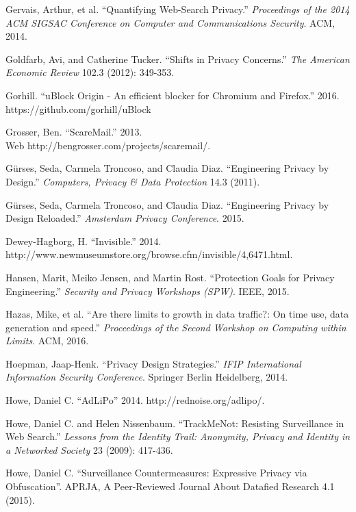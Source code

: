 \documentclass[conference]{IEEEtran}
\begin{document}
\begin{thebibliography}{99}
 Gervais, Arthur, et al. “Quantifying Web-Search Privacy.” \textit{Proceedings of the 2014 ACM SIGSAC Conference on Computer and Communications Security}. ACM, 2014.

 Goldfarb, Avi, and Catherine Tucker. “Shifts in Privacy Concerns.” \textit{The American Economic Review} 102.3 (2012): 349-353.

 Gorhill. “uBlock Origin - An efficient blocker for Chromium and Firefox.” 2016. https://github.com/gorhill/uBlock

 Grosser, Ben. “ScareMail.” 2013.\\ Web http://bengrosser.com/projects/scaremail/.

 G\"urses, Seda, Carmela Troncoso, and Claudia Diaz. “Engineering Privacy by Design.” \textit{Computers, Privacy \& Data Protection} 14.3 (2011).

 G\"urses, Seda, Carmela Troncoso, and Claudia Diaz. “Engineering Privacy by Design Reloaded.” \textit{Amsterdam Privacy Conference}. 2015.

 Dewey-Hagborg, H. ``Invisible.'' 2014. \\ http://www.newmuseumstore.org/browse.cfm/invisible/4,6471.html.

 Hansen, Marit, Meiko Jensen, and Martin Rost. “Protection Goals for Privacy Engineering.” \textit{Security and Privacy Workshops (SPW)}. IEEE, 2015.

 Hazas, Mike, et al. “Are there limits to growth in data traffic?: On time use, data generation and speed.” \textit{Proceedings of the Second Workshop on Computing within Limits}. ACM, 2016.

 Hoepman, Jaap-Henk. “Privacy Design Strategies.” \textit{IFIP International Information Security Conference}. Springer Berlin Heidelberg, 2014.

 Howe, Daniel C. “AdLiPo” 2014. http://rednoise.org/adlipo/.

 Howe, Daniel C. and Helen Nissenbaum. “TrackMeNot: Resisting Surveillance in Web Search.” \textit{Lessons from the Identity Trail: Anonymity, Privacy and Identity in a Networked Society} 23 (2009): 417-436.

 Howe, Daniel C. “Surveillance Countermeasures: Expressive Privacy via Obfuscation”. APRJA, A Peer-Reviewed Journal About Datafied Research 4.1 (2015).


\end{thebibliography}
\end{document}
